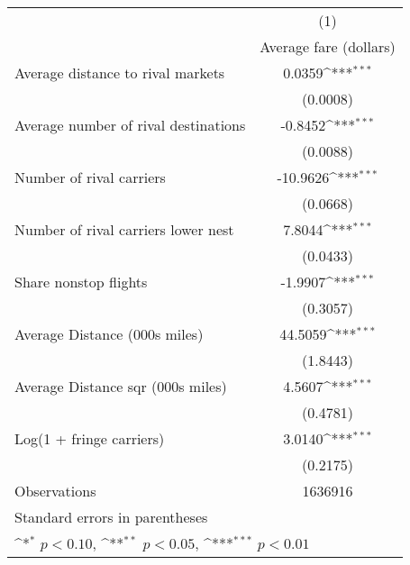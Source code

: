 {
\def\sym#1{\ifmmode^{#1}\else\(^{#1}\)\fi}
\begin{tabular}{l*{1}{c}}
\toprule
                    &\multicolumn{1}{c}{(1)}\\
                    &\multicolumn{1}{c}{Average fare (dollars)}\\
\midrule
Average distance to rival markets&      0.0359\sym{***}\\
                    &    (0.0008)         \\
\addlinespace
Average number of rival destinations&     -0.8452\sym{***}\\
                    &    (0.0088)         \\
\addlinespace
Number of rival carriers&    -10.9626\sym{***}\\
                    &    (0.0668)         \\
\addlinespace
Number of rival carriers lower nest&      7.8044\sym{***}\\
                    &    (0.0433)         \\
\addlinespace
Share nonstop flights &     -1.9907\sym{***}\\
                    &    (0.3057)         \\
\addlinespace
Average Distance (000s miles)&     44.5059\sym{***}\\
                    &    (1.8443)         \\
\addlinespace
Average Distance sqr (000s miles)&      4.5607\sym{***}\\
                    &    (0.4781)         \\
\addlinespace
Log(1 + fringe carriers)&      3.0140\sym{***}\\
                    &    (0.2175)         \\
\midrule
Observations        &     1636916         \\
\bottomrule
\multicolumn{2}{l}{\footnotesize Standard errors in parentheses}\\
\multicolumn{2}{l}{\footnotesize \sym{*} \(p<0.10\), \sym{**} \(p<0.05\), \sym{***} \(p<0.01\)}\\
\end{tabular}
}
